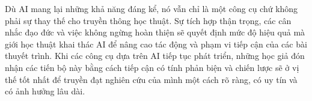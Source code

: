 Dù AI mang lại những khả năng đáng kể, nó vẫn chỉ là một công cụ chứ không phải sự thay thế cho truyền thông học thuật. Sự tích hợp thận trọng, các cân nhắc đạo đức và việc không ngừng hoàn thiện sẽ quyết định mức độ hiệu quả mà giới học thuật khai thác AI để nâng cao tác động và phạm vi tiếp cận của các bài thuyết trình. Khi các công cụ dựa trên AI tiếp tục phát triển, những học giả đón nhận các tiến bộ này bằng cách tiếp cận có tính phản biện và chiến lược sẽ ở vị thế tốt nhất để truyền đạt nghiên cứu của mình một cách rõ ràng, có uy tín và có ảnh hưởng lâu dài.
